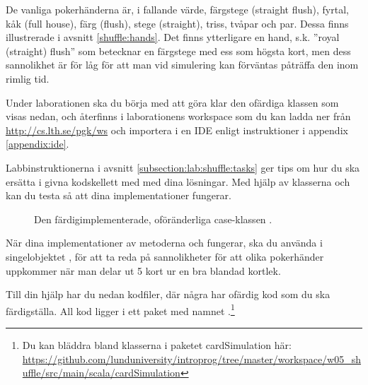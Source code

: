 De vanliga pokerhänderna är, i fallande värde, färgstege (straight flush), fyrtal, kåk (full house), färg (flush), stege (straight), triss, tvåpar och par. Dessa finns illustrerade i avsnitt \ref{shuffle:hands}.
Det finns ytterligare en hand, s.k. ''royal (straight) flush'' som betecknar en färgstege med ess som högsta kort, men dess sannolikhet är för låg för att man vid simulering kan förväntas påträffa den inom rimlig tid.

Under laborationen ska du börja med att göra klar den ofärdiga klassen  som visas nedan, och återfinns i laborationens workspace som du kan ladda ner från \url{http://cs.lth.se/pgk/ws} och importera i en IDE enligt instruktioner i appendix \ref{appendix:ide}.



Labbinstruktionerna i avsnitt \ref{subsection:lab:shuffle:tasks} ger tips om hur du ska ersätta  i givna kodskellett med med dina lösningar.
Med hjälp av klasserna  och  kan du testa så att dina implementationer fungerar.

\begin{figure}
\caption{Den färdigimplementerade, oföränderliga case-klassen .}
\label{shuffle:fig-card}
\end{figure}




När dina implementationer av metoderna  och  fungerar, ska du använda  i singelobjektet , för att ta reda på sannolikheter för att olika pokerhänder uppkommer när man delar ut 5 kort ur en bra blandad kortlek.

Till din hjälp har du nedan kodfiler, där några har ofärdig kod som du ska färdigställa. All kod  ligger i ett paket med namnet .\footnote{Du kan bläddra bland klasserna i paketet cardSimulation här: \\
\href{https://github.com/lunduniversity/introprog/tree/master/workspace/w05_shuffle/src/main/scala/cardSimulation}{\mbox{\fontsize{9}{11}\selectfont  https://github.com/lunduniversity/introprog/tree/master/workspace/w05\_shuffle/src/main/scala/cardSimulation}}}

